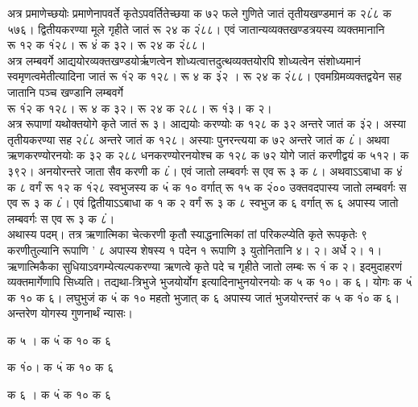 \documentclass[11pt, openany]{book}
\begin{document}
\begin{sloppypar}
\hangindent=0.2in \hspace{0.2in}अत्र प्रमाणेच्छयोः प्रमाणेनापवर्ते कृतेऽपवर्तितेच्छया क ७२ फले गुणिते जातं तृतीयखण्डमानं क २८ं८ क ५७६। द्वितीयकरण्या मूले गृहीते जातं रू २४ क २ं८८। एवं जातान्यव्यक्तखण्डत्रयस्य व्यक्तमानानि\\

\hangindent=0.2in \hspace{0.2in}रू १२ क १ं२८। रू ४ं क ३२। रू २४ क २ं८८।\\

\hangindent=0.2in \hspace{0.2in}अत्र लम्बवर्गे आद्ययोरव्यक्तखण्डयोर्ऋणत्वेन शोध्यत्वात्तदुत्थव्यक्तयोरपि शोध्यत्वेन संशोध्यमानं स्वमृणत्वमेतीत्यादिना जातं रू १ं२ क १२८। रू ४ क ३ं२ । रू २४ क २ं८८। एवमग्रिमव्यक्तद्वयेन सह जातानि पञ्च खण्डानि लम्बवर्गे\\

\hangindent=0.2in \hspace{0.2in}रू १ं२ क १२८। रू ४ क ३२। रू २४ क २८८। रू १ं३। क २।\\ 

\hangindent=0.2in \hspace{0.2in}अत्र रूपाणां यथोक्तयोगे कृते जातं रू ३। आद्ययोः करण्योः क १२८ क ३२ अन्तरे जातं क ३ं२। अस्या तृतीयकरण्या सह २८ं८ अन्तरे जातं क १२८। अस्याः पुनरन्त्यया क ७२ अन्तरे जातं क ८ं। अथवा ऋणकरण्योरनयोः क ३२ क २८८ धनकरण्योरनयोश्च क १२८ क ७२ योगे जातं करणीद्वयं क ५१२। क ३९२। अनयोरन्तरे जाता सैव करणी क ८ं। एवं जातो लम्बवर्गः स एव रू ३ क ८। अथवाऽऽबाधा क ४ं क ८ वर्गं रू १२ क १ं२८ स्वभुजस्य क ५ं क १० वर्गात् रू १५ क २ं०० उक्तवदपास्य जातो लम्बवर्गः स एव रू ३ क ८ं। एवं द्वितीयाऽऽबाधा क १ क २ वर्गं रू ३ क ८ स्वभुज क ६ वर्गात् रू ६ अपास्य जातो लम्बवर्गः स एव रू ३ क ८ं।\\

\hangindent=0.2in \hspace{0.2in}अथास्य पदम्। तत्र ऋणात्मिका चेत्करणी कृतौ स्याद्धनात्मिकां तां परिकल्प्येति कृते रूपकृतेः ९ करणीतुल्यानि रूपाणि ' ८ अपास्य शेषस्य १ पदेन १ रूपाणि ३ युतोनितानि ४। २। अर्धे २। १। ऋणात्मिकैका सुधियाऽवगम्येत्यल्पकरण्या ऋणत्वे कृते पदे च गृहीते जातो लम्बः रू १ं क २। इदमुदाहरणं व्यक्तमार्गेणापि सिध्यति। तद्यथा-त्रिभुजे भुजयोर्योग इत्यादिनाभुनयोरनयोः क ५ क १०। क ६। योगः क ५ं क १० क ६। लघुभुजं क ५ं क १० महतो भुजात् क ६ अपास्य जातं भुजयोरन्तरं क ५ क १ं० क ६। अन्तरेण योगस्य गुणनार्थं न्यासः।

\begin{center}
 क ५ । क ५ं क १० क ६

 क १ं०। क ५ं क १० क ६

 क ६ । क ५ं क १० क ६
\end{center}
\end{sloppypar}
\thispagestyle{empty}
\newpage
\end{document}
